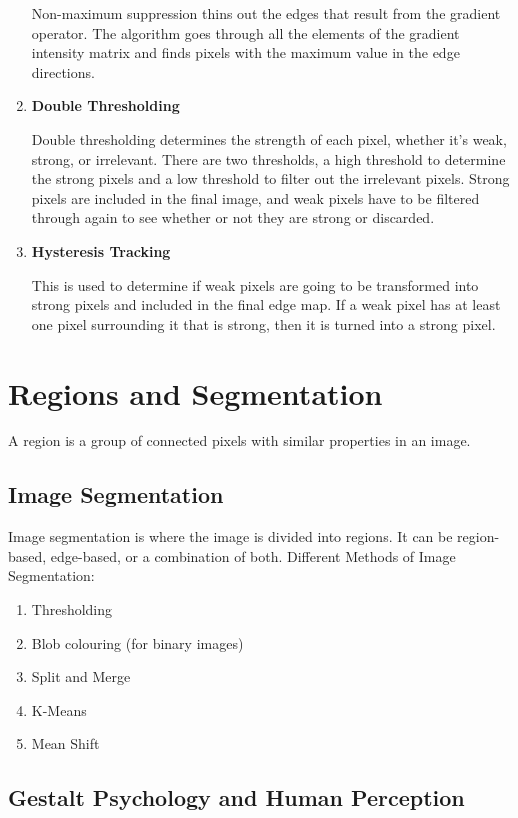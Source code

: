 \documentclass{article}
\begin{document}
\begin{multicols}{2}
\begin{enumerate}
        Non-maximum suppression thins out the edges that result from the gradient operator.
        The algorithm goes through all the elements of the gradient intensity matrix and finds pixels with the maximum value in the edge directions.

        \item \textbf{Double Thresholding}
        
        Double thresholding determines the strength of each pixel, whether it's weak, strong, or irrelevant.
        There are two thresholds, a high threshold to determine the strong pixels and a low threshold to filter out the irrelevant pixels.
        Strong pixels are included in the final image, and weak pixels have to be filtered through again to see whether or not they are strong or discarded.
        
        \item \textbf{Hysteresis Tracking}
        
        This is used to determine if weak pixels are going to be transformed into strong pixels and included in the final edge map.
        If a weak pixel has at least one pixel surrounding it that is strong, then it is turned into a strong pixel.
\end{enumerate}

\section{Regions and Segmentation}

A region is a group of connected pixels with similar properties in an image.
\subsection{Image Segmentation}

Image segmentation is where the image is divided into regions. It can be region-based, edge-based, or a combination of both.
Different Methods of Image Segmentation:
\begin{enumerate}
  \item {Thresholding}
  \item {Blob colouring (for binary images)}
  \item {Split and Merge}
  \item {K-Means}
  \item {Mean Shift}
\end{enumerate}

\subsection{Gestalt Psychology and Human Perception}


\end{multicols}
\end{document}
